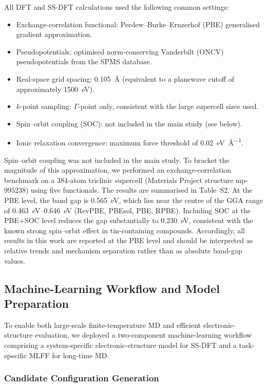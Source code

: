 All DFT and SS-DFT calculations used the following common settings:
\begin{itemize}
  \item Exchange-correlation functional: Perdew--Burke--Ernzerhof
        (PBE) generalised gradient approximation.\cite{pbe1996}
  \item Pseudopotentials: optimised norm-conserving Vanderbilt
        (ONCV) pseudopotentials from the SPMS database.\cite{oncv}
  \item Real-space grid spacing: \SI{0.105}{\angstrom} (equivalent
        to a planewave cutoff of approximately \SI{1500}{eV}).
  \item $k$-point sampling: $\Gamma$-point only, consistent with
        the large supercell sizes used.
  \item Spin--orbit coupling (SOC): not included in the main study
        (see below).
  \item Ionic relaxation convergence: maximum force threshold of
        \SI{0.02}{eV\per\angstrom}.
\end{itemize}

Spin--orbit coupling was not included in the main study.
To bracket the magnitude of this approximation, we performed an
exchange-correlation benchmark on a 384-atom triclinic \MASnI{}
supercell (Materials Project structure mp-995238) using five
functionals.
The results are summarised in Table~S2.
At the PBE level, the band gap is \SI{0.565}{eV}, which lies near
the centre of the GGA range of \SIrange{0.463}{0.646}{eV}
(RevPBE, PBEsol, PBE, RPBE).
Including SOC at the PBE+SOC level reduces the gap substantially to
\SI{0.230}{eV}, consistent with the known strong spin--orbit
effect in tin-containing compounds.\cite{ref_soc_sn}
Accordingly, all results in this work are reported at the PBE level
and should be interpreted as relative trends and mechanism
separation rather than as absolute band-gap values.

\subsection{Machine-Learning Workflow and Model Preparation}
\label{subsec:mlworkflow}

To enable both large-scale finite-temperature MD and efficient
electronic-structure evaluation, we deployed a two-component
machine-learning workflow comprising a system-specific
electronic-structure model for SS-DFT and a task-specific MLFF
for long-time MD.

\subsubsection{Candidate Configuration Generation}

